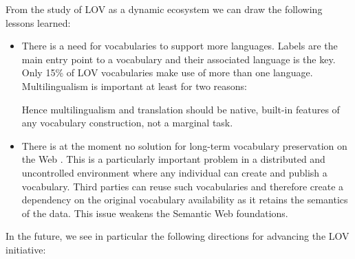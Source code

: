 \documentclass{iosart2c}
\begin{document}
From the study of LOV as a dynamic ecosystem we can draw the following lessons learned:
\begin{itemize}

\item There is a need for vocabularies to support more languages. Labels are the main entry point to a vocabulary and their associated language is the key. Only 15\% of LOV vocabularies make use of more than one language. Multilingualism is important at least for two reasons: 
Hence multilingualism and translation should be native, built-in features of any vocabulary construction, not a marginal task.

\item There is at the moment no solution for long-term vocabulary preservation on the Web \cite{Baker2013HLT}. This is a particularly important problem in a distributed and uncontrolled environment where any individual can create and publish a vocabulary. Third parties can reuse such vocabularies and therefore create a dependency on the original vocabulary availability as it retains the semantics of the data. This issue weakens the Semantic Web foundations.
\end{itemize}

In the future, we see in particular the following directions for advancing the LOV initiative:
\end{document}
